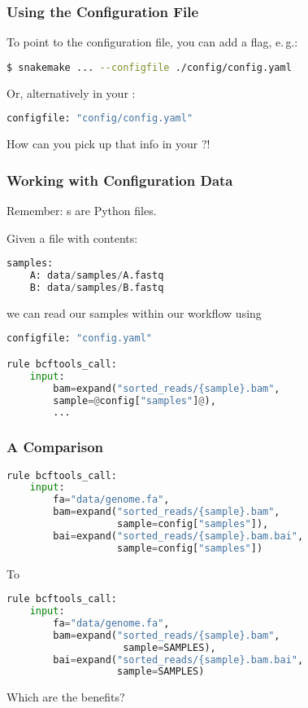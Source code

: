 \begin{frame}[fragile]
  \frametitle{Using the Configuration File}
  To point to the configuration file, you can add a flag, e.\,g.:
  \begin{lstlisting}[language=Bash, style=Shell]
$ snakemake ... --configfile ./config/config.yaml  
  \end{lstlisting}
  Or, alternatively in your :
  \begin{lstlisting}[language=Python,style=Python]
configfile: "config/config.yaml"
  \end{lstlisting}  
  \begin{question}
  	How can you pick up that info in your ?!
  \end{question}
\end{frame} 

\begin{frame}[fragile]
  \frametitle{Working with Configuration Data}
  \begin{hint}
  	Remember: s are Python files.
  \end{hint}
  \pause
  Given a file  with contents:
  \begin{lstlisting}[language=Python,style=Python]
samples:
    A: data/samples/A.fastq
    B: data/samples/B.fastq
  \end{lstlisting}
  we can read our samples within our workflow using
  \begin{lstlisting}[language=Python,style=Python]
configfile: "config.yaml"

rule bcftools_call:
    input:
        bam=expand("sorted_reads/{sample}.bam", 
        sample=@config["samples"]@),
        ...
  \end{lstlisting}
\end{frame}

\begin{frame}[fragile]
  \frametitle{A Comparison}
  \begin{lstlisting}[language=Python,style=Python,basicstyle=\footnotesize]
rule bcftools_call:
    input:
        fa="data/genome.fa",
        bam=expand("sorted_reads/{sample}.bam",
                   sample=config["samples"]),
        bai=expand("sorted_reads/{sample}.bam.bai",
                   sample=config["samples"])
  \end{lstlisting}
  To
  \begin{lstlisting}[language=Python,style=Python,basicstyle=\footnotesize]
rule bcftools_call:
    input:
        fa="data/genome.fa",
        bam=expand("sorted_reads/{sample}.bam",
                    sample=SAMPLES),
        bai=expand("sorted_reads/{sample}.bam.bai",
                   sample=SAMPLES)
  \end{lstlisting}
  \bcquestion Which are the benefits?
\end{frame}

